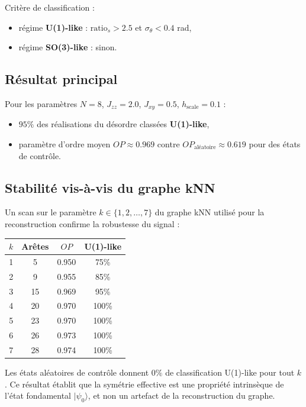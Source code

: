 \documentclass[11pt]{article}
\begin{document}
Critère de classification :
\begin{itemize}
\item régime \textbf{U(1)-like} : $\mathrm{ratio}_s > 2.5$ et $\sigma_\theta < 0.4$ rad,
\item régime \textbf{SO(3)-like} : sinon.
\end{itemize}

\subsection{Résultat principal}

Pour les paramètres $N=8$, $J_{zz}=2.0$, $J_{xy}=0.5$, $h_{\mathrm{scale}}=0.1$ :

\begin{itemize}
\item $95\%$ des réalisations du désordre classées \textbf{U(1)-like},
\item paramètre d'ordre moyen $OP \approx 0.969$ contre $OP_{\mathrm{aléatoire}} \approx 0.619$ pour des états de contrôle.
\end{itemize}

\subsection{Stabilité vis-à-vis du graphe kNN}

Un scan sur le paramètre $k \in \{1,2,\ldots,7\}$ du graphe kNN utilisé pour la reconstruction confirme la robustesse du signal :

\begin{center}
\begin{tabular}{cccc}
\toprule
$k$ & Arêtes & $OP$ & U(1)-like \\
\midrule
1 & 5  & 0.950 & 75\% \\
2 & 9  & 0.955 & 85\% \\
3 & 15 & 0.969 & 95\% \\
4 & 20 & 0.970 & 100\% \\
5 & 23 & 0.970 & 100\% \\
6 & 26 & 0.973 & 100\% \\
7 & 28 & 0.974 & 100\% \\
\bottomrule
\end{tabular}
\end{center}

Les états aléatoires de contrôle donnent $0\%$ de classification U(1)-like pour tout $k$. Ce résultat établit que la symétrie effective est une propriété intrinsèque de l'état fondamental $|\psi_0\rangle$, et non un artefact de la reconstruction du graphe.
\end{document}
